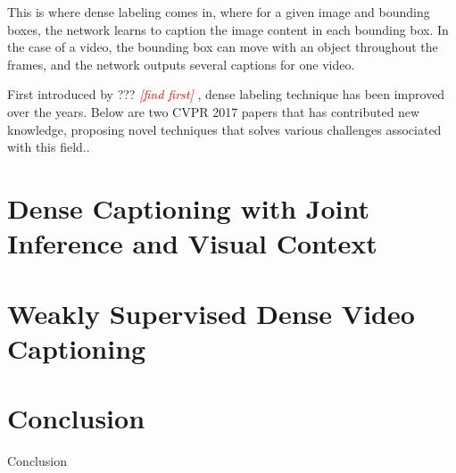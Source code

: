 \documentclass[12pt,onecolumn,letterpaper,draftclsnofoot]{article}
\newcommand{\todo}[1]{\textcolor{red}{{\em [#1]}} }
\begin{document}
This is where dense labeling comes in, where for a given image and bounding
boxes, the network learns to caption the image content in each bounding box.
In the case of a video, the bounding box can move with an object throughout
the frames, and the network outputs several captions for one video.

First introduced by ??? \todo{find first}, dense labeling technique has been
improved over the years. Below are two CVPR 2017 papers that has contributed
new knowledge, proposing novel techniques that solves various challenges
associated with this field..

\section{Dense Captioning with Joint Inference and Visual Context}

\section{Weakly Supervised Dense Video Captioning}

\section{Conclusion}

Conclusion

{\small


}
\end{document}
